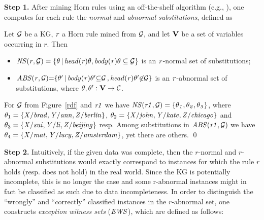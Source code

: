 \noindent \textbf{Step 1.} After mining Horn rules using an off-the-shelf algorithm (e.g.,
 \cite{amie}), %
 one computes for each rule the \emph{normal} and
\emph{abnormal substitutions}, defined as

\begin{definition}\label{sec:rulelearn}
Let $\mathcal{G}$ be a KG, $\mathit{r}$ a Horn rule mined from $\mathcal{G}$, and let ${\mathbf V}$ be a set of variables occurring in $r$. Then
\begin{itemize}
\item $\mathit{NS(r, \mathcal{G})=\{\theta\, |\, head(r)\theta,body(r)\theta \subseteq \mathcal{G}\}}$ is an $\mathit{r}$-normal set of substitutions;
\item $\mathit{ABS(r, \mathcal{G}){=}\{\theta'\, |\, body(r)\theta' {\subseteq} \mathcal{G}\,{,}\,head(r)\theta' {\not \in} \mathcal{G}\}}$ is an $\mathit{r}$-abnormal set of substitutions, 
where $\theta,\theta':{\mathbf V} \rightarrow \mathcal{C}$.
\end{itemize} 
\end{definition}

\begin{example}\label{ex:abns}
For $\mathcal{G}$ from Figure~\ref{rdf} and $\mathit{r1}$ 
we have $\mathit{NS(r1,\mathcal{G})}=\{\mathit{\theta_1,\theta_2,\theta_3}\}$, where $\theta_1=\{\mathit{X/brad,Y/ann,Z/berlin}\}$, $\theta_2=\{\mathit{X/john,Y/kate,Z/chicago}\}$ and $\theta_3=\{\mathit{X/sui,Y/li,Z/beijing}\}$ resp. Among substitutions in $\mathit{ABS(r1,\mathcal{G})}$ we have $\theta_4=\{\mathit{X/mat,Y/lucy,Z/amsterdam}\}$, yet there are others. \qed 
\end{example}
 


\noindent \textbf{Step 2.} Intuitively, if the given data was complete, then the $r$-normal
and $r$-abnormal substitutions would exactly correspond to instances for which
the rule $r$ holds (resp. does not hold) in the real world. Since the KG is
potentially incomplete, this is no longer the case and some r-abnormal instances
might in fact be classified as such due to data incompleteness.  In order to
distinguish the ``wrongly'' and ``correctly'' classified instances in the
$r$-abnormal set, one constructs \emph{exception witness sets} ($\mathit{EWS}$), which
are defined as follows:

